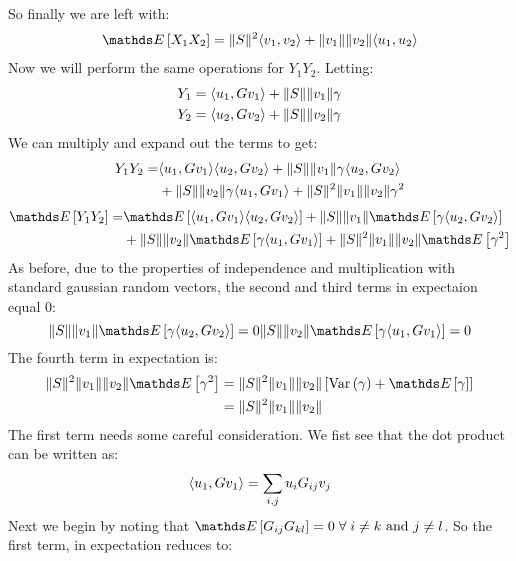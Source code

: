 So finally we are left with:
\begin{align*}
    \pexp{X_1X_2} = \norm{S}^2\dotprod{v_1, v_2} + \norm{v_1}\norm{v_2}\dotprod{u_1, u_2}
\end{align*}
Now we will perform the same operations for $Y_1Y_2$. Letting:
\begin{align*}
    Y_1 &= \langle u_1, Gv_1 \rangle + \lVert S \rVert\lVert v_1 \rVert\gamma \\
    Y_2 &= \langle u_2, Gv_2 \rangle + \lVert S \rVert\lVert v_2 \rVert\gamma
\end{align*}
We can multiply and expand out the terms to get:
\begin{align*}
    Y_1Y_2 = &\langle u_1, Gv_1 \rangle\langle u_2, Gv_2 \rangle + \lVert S \rVert\lVert v_1 \rVert\gamma\langle u_2, Gv_2 \rangle\\ 
             &+ \lVert S \rVert\lVert v_2 \rVert\gamma\langle u_1, Gv_1 \rangle + \lVert S \rVert^2\lVert v_1 \rVert\lVert v_2 \rVert\gamma^2
\end{align*}
\begin{align*}
    \pexp{Y_1Y_2} = &\pexp{\dotprod{u_1, Gv_1}\dotprod{u_2, Gv_2}} + \norm{S}\norm{v_1}\pexp{\gamma\dotprod{u_2, Gv_2}}\\ 
                    &+ \norm{S}\norm{v_2}\pexp{\gamma\dotprod{u_1, Gv_1}} + \norm{S}^2\norm{v_1}\norm{v_2}\pexp{\gamma^2}
\end{align*}
As before, due to the properties of independence and multiplication with standard gaussian random vectors, the second
and third terms in expectaion equal 0:
\begin{equation*}
    \norm{S}\norm{v_1}\pexp{\gamma\dotprod{u_2, Gv_2}} = 0 \\
    \norm{S}\norm{v_2}\pexp{\gamma\dotprod{u_1, Gv_1}} = 0
\end{equation*}
The fourth term in expectation is:
\begin{align*}
    \norm{S}^2\norm{v_1}\norm{v_2}\pexp{\gamma^2} &= \norm{S}^2\norm{v_1}\norm{v_2}\left[\operatorname{Var}\left(\gamma\right) + \pexp{\gamma}\right] \\
                                                  &= \norm{S}^2\norm{v_1}\norm{v_2}   
\end{align*}
The first term needs some careful consideration. We fist see that the dot product can be written as:
\begin{equation*}
    \langle u_1, Gv_1 \rangle = \sum_{i,j}{u_iG_{ij}v_j}
\end{equation*}
Next we begin by noting that $\pexp{G_{ij}G_{kl}} = 0 \; \forall \; i \neq k \text{ and } j \neq l$. So the first term, in
expectation reduces to:
